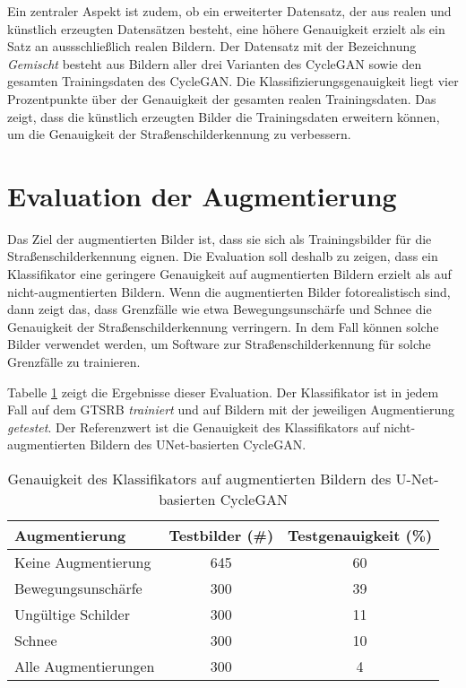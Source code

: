 Ein zentraler Aspekt ist zudem, ob ein erweiterter Datensatz, der aus realen und künstlich erzeugten Datensätzen besteht, eine höhere Genauigkeit erzielt als ein Satz an aussschließlich realen Bildern. Der Datensatz mit der Bezeichnung \emph{Gemischt} besteht aus Bildern aller drei Varianten des \ac{CycleGAN} sowie den gesamten Trainingsdaten des \ac{CycleGAN}. Die Klassifizierungsgenauigkeit liegt vier Prozentpunkte über der Genauigkeit der gesamten realen Trainingsdaten. Das zeigt, dass die künstlich erzeugten Bilder die Trainingsdaten erweitern können, um die Genauigkeit der Straßenschilderkennung zu verbessern.

\section{Evaluation der Augmentierung}

Das Ziel der augmentierten Bilder ist, dass sie sich als Trainingsbilder für die Straßenschilderkennung eignen. Die Evaluation soll deshalb zu zeigen, dass ein Klassifikator eine geringere Genauigkeit auf augmentierten Bildern erzielt als auf nicht-augmentierten Bildern. Wenn die augmentierten Bilder fotorealistisch sind, dann zeigt das, dass Grenzfälle wie etwa Bewegungsunschärfe und Schnee die Genauigkeit der Straßenschilderkennung verringern. In dem Fall können solche Bilder verwendet werden, um Software zur Straßenschilderkennung für solche Grenzfälle zu trainieren.

Tabelle \ref{tab:augmentation-classification-acc} zeigt die Ergebnisse dieser Evaluation. Der Klassifikator ist in jedem Fall auf dem \ac{GTSRB} \emph{trainiert} und auf Bildern mit der jeweiligen Augmentierung \emph{getestet}. Der Referenzwert ist die Genauigkeit des Klassifikators auf nicht-augmentierten Bildern des UNet-basierten \ac{CycleGAN}.

\begin{table}[h]
	\centering
	\begin{tabular}{|l|c|c|}
	\hline
	Augmentierung & Testbilder (\#) & Testgenauigkeit\tablefootnote{Des Klassifikators auf dieser Augmentierung, wenn er auf dem \ac{GTSRB} trainiert ist} (\%) \\ \hline \hline
	Keine Augmentierung & 645 & 60 \\ \hline \hline
	Bewegungsunschärfe & 300 & 39 \\ \hline
   Ungültige Schilder & 300 & 11 \\ \hline
   Schnee & 300 & 10 \\ \hline \hline
	Alle Augmentierungen & 300 & 4 \\ \hline
	\end{tabular}
	\caption{Genauigkeit des Klassifikators auf augmentierten Bildern des U-Net-basierten \ac{CycleGAN}}
	\label{tab:augmentation-classification-acc}
\end{table}


